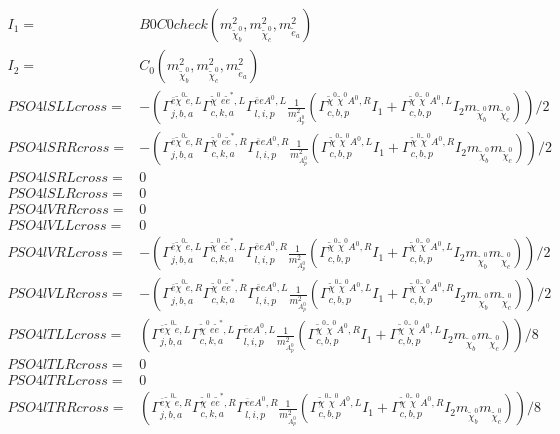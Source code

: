 \documentclass[A4,landscape]{article}
\begin{document}
\begin{align} 
I_1= & B0C0check(m^2_{\tilde{\chi}^0_{{b}}}, m^2_{\tilde{\chi}^0_{{c}}}, m^2_{\tilde{e}_{{a}}}) \\ 
I_2= & C_0(m^2_{\tilde{\chi}^0_{{b}}}, m^2_{\tilde{\chi}^0_{{c}}}, m^2_{\tilde{e}_{{a}}}) \\ 
  PSO4lSLLcross= & -( \Gamma^{\bar{e}\tilde{\chi}^0 \tilde{e} ,L}_{j, b, a} \Gamma^{\tilde{\chi}^0 e \tilde{e}^*,L}_{c, k, a} \Gamma^{\bar{e}e A^0 ,L}_{l, i, p} \frac{1}{m^2_{A^0_{{p}}}} (\Gamma^{\tilde{\chi}^0 \tilde{\chi}^0 A^0 ,R}_{c, b, p} I_1 + \Gamma^{\tilde{\chi}^0 \tilde{\chi}^0 A^0 ,L}_{c, b, p} I_2 m_{\tilde{\chi}^0_{{b}}} m_{\tilde{\chi}^0_{{c}}}))/2 \\ 
  PSO4lSRRcross= & -( \Gamma^{\bar{e}\tilde{\chi}^0 \tilde{e} ,R}_{j, b, a} \Gamma^{\tilde{\chi}^0 e \tilde{e}^*,R}_{c, k, a} \Gamma^{\bar{e}e A^0 ,R}_{l, i, p} \frac{1}{m^2_{A^0_{{p}}}} (\Gamma^{\tilde{\chi}^0 \tilde{\chi}^0 A^0 ,L}_{c, b, p} I_1 + \Gamma^{\tilde{\chi}^0 \tilde{\chi}^0 A^0 ,R}_{c, b, p} I_2 m_{\tilde{\chi}^0_{{b}}} m_{\tilde{\chi}^0_{{c}}}))/2 \\ 
  PSO4lSRLcross= & 0 \\ 
  PSO4lSLRcross= & 0 \\ 
  PSO4lVRRcross= & 0 \\ 
  PSO4lVLLcross= & 0 \\ 
  PSO4lVRLcross= & -( \Gamma^{\bar{e}\tilde{\chi}^0 \tilde{e} ,L}_{j, b, a} \Gamma^{\tilde{\chi}^0 e \tilde{e}^*,L}_{c, k, a} \Gamma^{\bar{e}e A^0 ,R}_{l, i, p} \frac{1}{m^2_{A^0_{{p}}}} (\Gamma^{\tilde{\chi}^0 \tilde{\chi}^0 A^0 ,R}_{c, b, p} I_1 + \Gamma^{\tilde{\chi}^0 \tilde{\chi}^0 A^0 ,L}_{c, b, p} I_2 m_{\tilde{\chi}^0_{{b}}} m_{\tilde{\chi}^0_{{c}}}))/2 \\ 
  PSO4lVLRcross= & -( \Gamma^{\bar{e}\tilde{\chi}^0 \tilde{e} ,R}_{j, b, a} \Gamma^{\tilde{\chi}^0 e \tilde{e}^*,R}_{c, k, a} \Gamma^{\bar{e}e A^0 ,L}_{l, i, p} \frac{1}{m^2_{A^0_{{p}}}} (\Gamma^{\tilde{\chi}^0 \tilde{\chi}^0 A^0 ,L}_{c, b, p} I_1 + \Gamma^{\tilde{\chi}^0 \tilde{\chi}^0 A^0 ,R}_{c, b, p} I_2 m_{\tilde{\chi}^0_{{b}}} m_{\tilde{\chi}^0_{{c}}}))/2 \\ 
  PSO4lTLLcross= & ( \Gamma^{\bar{e}\tilde{\chi}^0 \tilde{e} ,L}_{j, b, a} \Gamma^{\tilde{\chi}^0 e \tilde{e}^*,L}_{c, k, a} \Gamma^{\bar{e}e A^0 ,L}_{l, i, p} \frac{1}{m^2_{A^0_{{p}}}} (\Gamma^{\tilde{\chi}^0 \tilde{\chi}^0 A^0 ,R}_{c, b, p} I_1 + \Gamma^{\tilde{\chi}^0 \tilde{\chi}^0 A^0 ,L}_{c, b, p} I_2 m_{\tilde{\chi}^0_{{b}}} m_{\tilde{\chi}^0_{{c}}}))/8 \\ 
  PSO4lTLRcross= & 0 \\ 
  PSO4lTRLcross= & 0 \\ 
  PSO4lTRRcross= & ( \Gamma^{\bar{e}\tilde{\chi}^0 \tilde{e} ,R}_{j, b, a} \Gamma^{\tilde{\chi}^0 e \tilde{e}^*,R}_{c, k, a} \Gamma^{\bar{e}e A^0 ,R}_{l, i, p} \frac{1}{m^2_{A^0_{{p}}}} (\Gamma^{\tilde{\chi}^0 \tilde{\chi}^0 A^0 ,L}_{c, b, p} I_1 + \Gamma^{\tilde{\chi}^0 \tilde{\chi}^0 A^0 ,R}_{c, b, p} I_2 m_{\tilde{\chi}^0_{{b}}} m_{\tilde{\chi}^0_{{c}}}))/8 \\ 
\end{align} 
\end{document}
